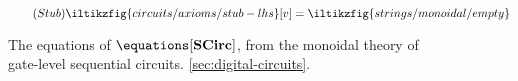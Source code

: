\begin{figure}[p]
    \begin{minipage}[b]{0.22\textwidth}
        \begin{equation}
            \tag{\(\mathsf{Stub}\)}
            \iltikzfig{circuits/axioms/stub-lhs}[v]
            =
            \iltikzfig{strings/monoidal/empty}
            \label{eq:stub}
        \end{equation}
    \end{minipage}
    \begin{minipage}[b]{0.3\textwidth}
        \forkgateeqn
    \end{minipage}
    \begin{minipage}[b]{0.25\textwidth}
        \stubgateeqn
    \end{minipage}
    \begin{minipage}[b]{0.25\textwidth}
        \stubdelayeqn
    \end{minipage}
    \begin{minipage}[b]{0.22\textwidth}
        \forkjoininverseeqn
    \end{minipage}
    \begin{minipage}[b]{0.4\textwidth}
        \streamingeqn
    \end{minipage}
    \begin{minipage}[b]{0.25\textwidth}
        \disconnecteqn
    \end{minipage}
    \begin{minipage}[b]{0.25\textwidth}
        \forkdelayeqn
    \end{minipage}
    \begin{minipage}[b]{0.25\textwidth}
        \joindelayeqn
    \end{minipage}
    \begin{minipage}[b]{0.3\textwidth}
        \instantfeedbackeqn
    \end{minipage}
    \begin{minipage}[b]{0.35\textwidth}
        \delaydiscardeqn
    \end{minipage}
    \caption{
        The equations of \(\equations[\mathbf{SCirc}]\), from the monoidal
        theory of gate-level sequential circuits.
        \cref{sec:digital-circuits}.
    }
    \label{fig:circuit-equations}
\end{figure}